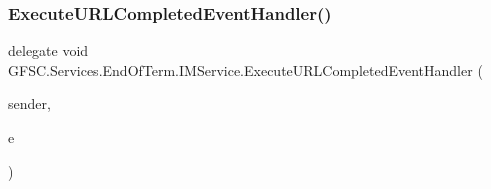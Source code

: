 \subsubsection{\texorpdfstring{Execute\+U\+R\+L\+Completed\+Event\+Handler()}{ExecuteURLCompletedEventHandler()}}
{\footnotesize\ttfamily delegate void G\+F\+S\+C.\+Services.\+End\+Of\+Term.\+I\+M\+Service.\+Execute\+U\+R\+L\+Completed\+Event\+Handler (\begin{DoxyParamCaption}\item[{object}]{sender,  }\item[{\mbox{\hyperlink{class_g_f_s_c_1_1_services_1_1_end_of_term_1_1_i_m_service_1_1_execute_u_r_l_completed_event_args}{Execute\+U\+R\+L\+Completed\+Event\+Args}}}]{e }\end{DoxyParamCaption})}






